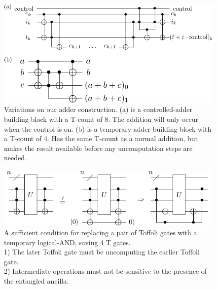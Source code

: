 \documentclass[twocolumn]{revtex4-1}
\begin{document}
\begin{figure}[H]
  \includegraphics[width=\linewidth]{other-adder-building-blocks.pdf}
  \caption{
	Variations on our adder construction.
	(a) is a controlled-adder building-block with a T-count of 8.
	The addition will only occur when the control is on.
	(b) is a temporary-adder building-block with a T-count of 4.
	Has the same T-count as a normal addition, but makes the result available before any uncomputation steps are needed.
  }
  \label{fig:other-adder-building-blocks}
\end{figure}

\begin{figure}[H]
  \includegraphics[width=\linewidth]{paired-toffoli-replacement-rule.pdf}
  \caption{
	A sufficient condition for replacing a pair of Toffoli gates with a temporary logical-AND, saving 4 T gates.\\
	1) The later Toffoli gate must be uncomputing the earlier Toffoli gate.\\
	2) Intermediate operations must not be sensitive to the presence of the entangled ancilla.
  }
  \label{fig:paired-toffoli-replacement-rule}
\end{figure}

\vspace{5cm}
\end{document}
